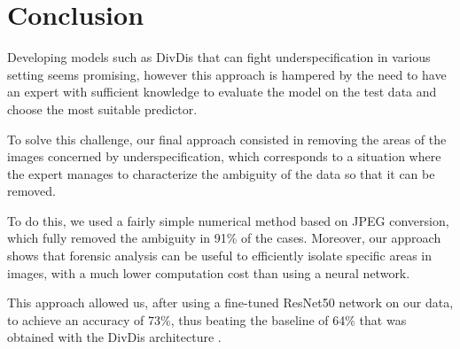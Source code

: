 \documentclass[sigconf, nonacm]{acmart}
\begin{document}
\section{Conclusion}

Developing models such as DivDis \cite{lee_diversify_2022} that can fight underspecification in various setting seems promising, however this approach is hampered by the need to have an expert with sufficient knowledge to evaluate the model on the test data and choose the most suitable predictor. 

To solve this challenge, our final approach consisted in removing the areas of the images concerned by underspecification, which corresponds to a situation where the expert manages to characterize the ambiguity of the data so that it can be removed.

To do this, we used a fairly simple numerical method based on JPEG conversion, which fully removed the ambiguity in 91\% of the cases. Moreover, our approach shows that forensic analysis can be useful to efficiently isolate specific areas in images, with a much lower computation cost than using a neural network.

This approach allowed us, after using a fine-tuned ResNet50 \cite{he_deep_2015} network on our data, to achieve an accuracy of 73\%, thus beating the baseline of 64\% that was obtained with the DivDis architecture \cite{lee_diversify_2022}.



\end{document}
